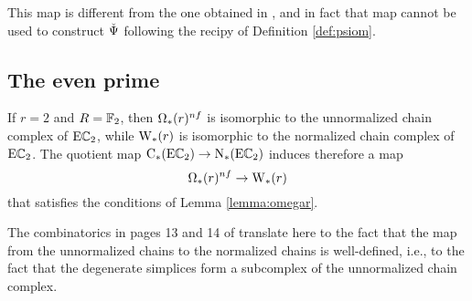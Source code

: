 This map is different from the one obtained in \cite[Prop.~6.16]{brumfiel2023explicit}, and in fact that map cannot be used to construct $\operatorname{\check{\Psi}}$ following the recipy of Definition \ref{def:psiom}.


\subsection{The even prime}\label{ss:even} If $r= 2$ and $R=\mathbb{F}_2$, then $\Omega_*(r)^{nf}$ is isomorphic to the unnormalized chain complex of $\mathrm{E}\mathbb{C}_2$, while $\operatorname{W}_{*}(r)$ is isomorphic to the normalized chain complex of $\mathrm{E}\mathbb{C}_2$. The quotient map $\operatorname{C}_{*}(\mathrm{E}\mathbb{C}_2) \to \operatorname{N}_{*}(\mathrm{E}\mathbb{C}_2)$ induces therefore a map
\[
\Omega_*(r)^{nf} \to \operatorname{W}_{*}(r)
\]
that satisfies the conditions of Lemma \ref{lemma:omegar}.
\begin{remark}
	The combinatorics in pages 13 and 14 of \cite{medina2021fast_sq} translate here to the fact that the map from the unnormalized chains to the normalized chains is well-defined, i.e., to the fact that the degenerate simplices form a subcomplex of the unnormalized chain complex.
\end{remark}